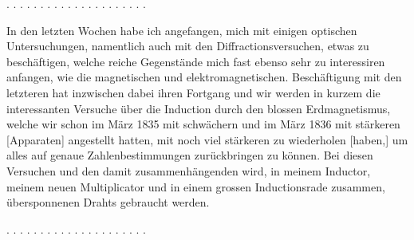 \noindent . . . . . . . . . . . . . . . . . . . . .\par
\noindent\hspace*{\parindent}In den letzten Wochen habe ich angefangen, mich mit einigen optischen Untersuchungen, namentlich auch mit den Diffractionsversuchen, etwas zu beschäftigen, welche reiche Gegenstände mich fast ebenso sehr zu interessiren anfangen, wie die magnetischen und elektromagnetischen. Beschäftigung mit den letzteren hat inzwischen dabei ihren Fortgang und wir werden in kurzem die interessanten Versuche über die Induction durch den blossen Erdmagnetismus, welche wir schon im März 1835 mit schwächern und im März 1836 mit stärkeren [Apparaten] angestellt hatten, mit noch viel stärkeren zu wiederholen [haben,] um alles auf genaue Zahlenbestimmungen zurückbringen zu können. Bei diesen Versuchen und den damit zusammenhängenden wird, in meinem Inductor, meinem neuen Multiplicator und in einem grossen Inductionsrade zusammen,  übersponnenen Drahts gebraucht werden.\par
\noindent . . . . . . . . . . . . . . . . . . . . .
\clearpage\endgroup
